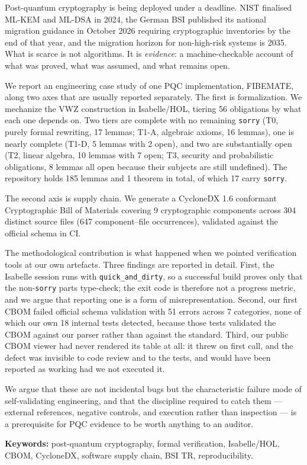 %

Post-quantum cryptography is being deployed under a deadline. NIST finalised
ML-KEM and ML-DSA in 2024, the German BSI published its national migration
guidance in October 2026 requiring cryptographic inventories by the end of that
year, and the migration horizon for non-high-risk systems is 2035. What is
scarce is not algorithms. It is \emph{evidence}: a machine-checkable account of
what was proved, what was assumed, and what remains open.

We report an engineering case study of one PQC implementation, FIBEMATE, along
two axes that are usually reported separately. The first is formalization. We
mechanize the VWZ construction in Isabelle/HOL, tiering 56 obligations by what
each one depends on. Two tiers are complete with no remaining \texttt{sorry}
(T0, purely formal rewriting, 17 lemmas; T1-A, algebraic axioms, 16 lemmas), one
is nearly complete (T1-D, 5 lemmas with 2 open), and two are substantially open
(T2, linear algebra, 10 lemmas with 7 open; T3, security and probabilistic
obligations, 8 lemmas all open because their subjects are still undefined). The
repository holds 185 lemmas and 1 theorem in total, of which 17 carry
\texttt{sorry}.

The second axis is supply chain. We generate a CycloneDX 1.6 conformant
Cryptographic Bill of Materials covering 9 cryptographic components across 304
distinct source files (647 component--file occurrences), validated against the
official schema in CI.

The methodological contribution is what happened when we pointed verification
tools at our own artefacts. Three findings are reported in detail. First, the
Isabelle session runs with \texttt{quick\_and\_dirty}, so a successful build
proves only that the non-\texttt{sorry} parts type-check; the exit code is
therefore not a progress metric, and we argue that reporting one is a form of
misrepresentation. Second, our first CBOM failed official schema validation with
51 errors across 7 categories, none of which our own 18 internal tests detected,
because those tests validated the CBOM against our parser rather than against
the standard. Third, our public CBOM viewer had never rendered its table at all:
it threw on first call, and the defect was invisible to code review and to the
tests, and would have been reported as working had we not executed it.

We argue that these are not incidental bugs but the characteristic failure mode
of self-validating engineering, and that the discipline required to catch them
--- external references, negative controls, and execution rather than inspection
--- is a prerequisite for PQC evidence to be worth anything to an auditor.

\medskip
\noindent\textbf{Keywords:} post-quantum cryptography, formal verification,
Isabelle/HOL, CBOM, CycloneDX, software supply chain, BSI TR, reproducibility.
